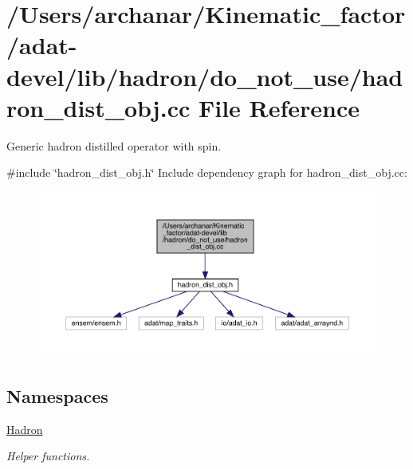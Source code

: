 \hypertarget{adat-devel_2lib_2hadron_2do__not__use_2hadron__dist__obj_8cc}{}\section{/\+Users/archanar/\+Kinematic\+\_\+factor/adat-\/devel/lib/hadron/do\+\_\+not\+\_\+use/hadron\+\_\+dist\+\_\+obj.cc File Reference}
\label{adat-devel_2lib_2hadron_2do__not__use_2hadron__dist__obj_8cc}


Generic hadron distilled operator with spin.  


{\ttfamily \#include \char`\"{}hadron\+\_\+dist\+\_\+obj.\+h\char`\"{}}\newline
Include dependency graph for hadron\+\_\+dist\+\_\+obj.\+cc\+:
\nopagebreak
\begin{figure}[H]
\begin{center}
\leavevmode
\includegraphics[width=350pt]{d3/d89/adat-devel_2lib_2hadron_2do__not__use_2hadron__dist__obj_8cc__incl}
\end{center}
\end{figure}
\subsection*{Namespaces}
\begin{DoxyCompactItemize}
\item 
 \mbox{\hyperlink{namespaceHadron}{Hadron}}
\begin{DoxyCompactList}\small\item\em Helper functions. \end{DoxyCompactList}\end{DoxyCompactItemize}
